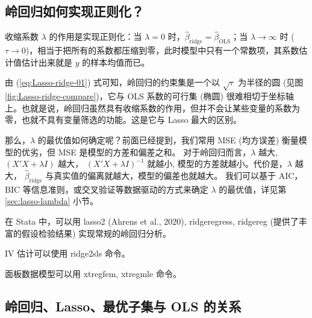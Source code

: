 \subsection{岭回归如何实现正则化？}

收缩系数 $\lambda$ 的作用是实现正则化：当 $\lambda=0$ 时，$\widehat{\beta}_{\text {ridge}}=\widehat{\beta}_{\text {OLS}}$；当 $\lambda \to \infty$ 时 ($\tau \to 0$)，相当于把所有的系数都压缩到零，此时模型中只有一个常数项，其系数估计值估计出来就是 $y$ 的样本均值而已。

由 (\ref{eq:Lasso-ridge-01}) 式可知，岭回归的约束集是一个以 $\sqrt{\tau}$ 为半径的圆 (见图 \ref{fig:Lasso-ridge-compare})，它与 OLS 系数的可行集 (椭圆) 很难相切于坐标轴上。也就是说，岭回归虽然具有收缩系数的作用，但并不会让某些变量的系数为零，也就不具有变量筛选的功能。这是它与 Lasso 最大的区别。   

那么，$\lambda$ 的最优值如何确定呢？前面已经提到，我们常用 MSE (均方误差) 衡量模型的优劣，但 MSE 是模型的方差和偏差之和。
对于岭回归而言，$\lambda$ 越大, $(X'X+\lambda I)$ 越大， $\left(X'X+\lambda I\right)^{-1}$ 就越小, 模型的方差就越小。代价是，$\lambda$ 越大， $\widehat{\beta}_{\text {ridge}}$ 与真实值的偏离就越大，模型的偏差也就越大。
我们可以基于 AIC，BIC 等信息准则，或交叉验证等数据驱动的方式来确定 $\lambda$ 的最优值，详见第 \ref{sec:lasso-lambda} 小节。

在 Stata 中，可以用 lasso2 (Ahrens et al., 2020), ridgeregress, ridgereg (提供了丰富的假设检验结果) 实现常规的岭回归分析。

IV 估计可以使用 ridge2sls 命令。 

面板数据模型可以用 xtregfem, xtregmle 命令。 

\subsection{岭回归、Lasso、最优子集与 OLS 的关系}



